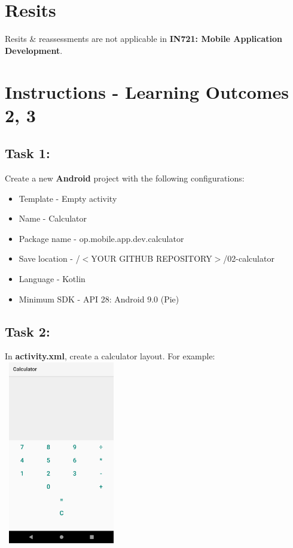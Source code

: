 \documentclass{article}
\begin{document}
\section*{Resits}
Resits \& reassessments are not applicable in \textbf{IN721: Mobile Application Development}.

\section*{Instructions - Learning Outcomes 2, 3}

\subsection*{Task 1:} Create a new \textbf{Android} project with the following configurations:
\begin{itemize}
	\item Template - Empty activity
	\item Name - Calculator
	\item Package name - op.mobile.app.dev.calculator
	\item Save location - /$<$YOUR GITHUB REPOSITORY$>$/02-calculator
	\item Language - Kotlin
	\item Minimum SDK - API 28: Android 9.0 (Pie)
\end{itemize}

\subsection*{Task 2:} In \textbf{activity.xml}, create a calculator layout. For example: \\

\includegraphics[width=5cm, height=8cm]{./img/02-android-overview/calculator.png}  \\
\end{document}

